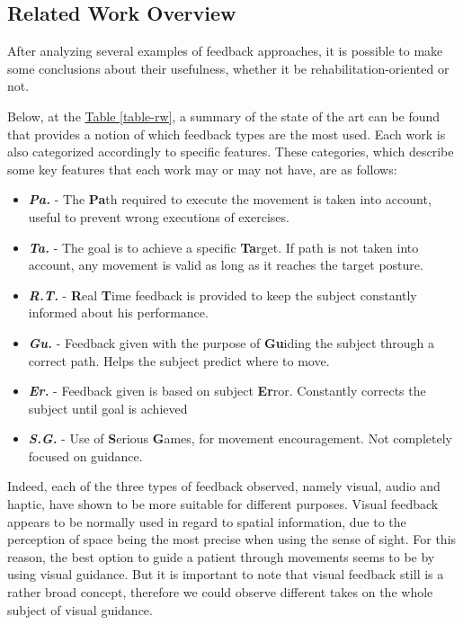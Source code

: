 \documentclass[runningheads]{llncs}
\begin{document}
\subsection{Related Work Overview}



After analyzing several examples of feedback approaches, it is possible to make some conclusions about their usefulness, whether it be rehabilitation-oriented or not.

Below, at the \hyperref[table-rw]{Table \ref{table-rw}}, a summary of the state of 
the art can be found that provides a notion of which feedback types are the most used. 
Each work is also categorized accordingly to specific features. These categories, which describe some key features that each work may or may not have, are as follows:
\begin{itemize}
\item \emph{\textbf{Pa.}} - The \textbf{Pa}th required to execute the movement is taken into account, useful to prevent wrong executions of exercises.
\item \emph{\textbf{Ta.}} - The goal is to achieve a specific \textbf{Ta}rget. If path is not taken into account, any movement is valid as long as it reaches the target posture.
\item \emph{\textbf{R.T.}} - \textbf{R}eal \textbf{T}ime feedback is provided to keep the subject constantly informed about his performance.
\item \emph{\textbf{Gu.}} - Feedback given with the purpose of \textbf{Gu}iding the subject through a correct path. Helps the subject predict where to move. 
\item \emph{\textbf{Er.}} - Feedback given is based on subject \textbf{Er}ror. Constantly corrects the subject until goal is achieved
\item \emph{\textbf{S.G.}} - Use of \textbf{S}erious \textbf{G}ames, for movement encouragement. Not completely focused on guidance.
\end{itemize}

Indeed, each of the three types of feedback observed, namely visual, audio and haptic, have shown to be more suitable for different purposes.
Visual feedback appears to be normally used in regard to spatial information, due to the perception of space being the most precise when using the sense of sight. For this reason,
the best option to guide a patient through movements seems to be by using visual guidance.
But it is important to note that visual feedback still is a rather broad concept, therefore we could observe different takes on the whole subject of visual guidance.
\end{document}
